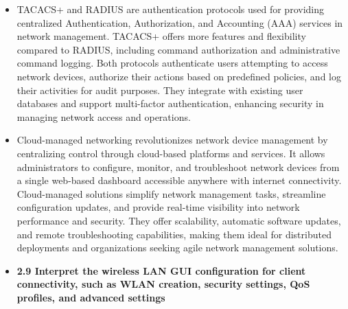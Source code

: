 \documentclass{article}
\begin{document}
\begin{itemize}
	\item[] TACACS+ and RADIUS are authentication protocols used for providing centralized Authentication, Authorization, and Accounting (AAA) services in network management. TACACS+ offers more features and flexibility compared to RADIUS, including command authorization and administrative command logging. Both protocols authenticate users attempting to access network devices, authorize their actions based on predefined policies, and log their activities for audit purposes. They integrate with existing user databases and support multi-factor authentication, enhancing security in managing network access and operations.
	\item[] Cloud-managed networking revolutionizes network device management by centralizing control through cloud-based platforms and services. It allows administrators to configure, monitor, and troubleshoot network devices from a single web-based dashboard accessible anywhere with internet connectivity. Cloud-managed solutions simplify network management tasks, streamline configuration updates, and provide real-time visibility into network performance and security. They offer scalability, automatic software updates, and remote troubleshooting capabilities, making them ideal for distributed deployments and organizations seeking agile network management solutions.
  
  \item \textbf{2.9 Interpret the wireless LAN GUI configuration for client connectivity, such as WLAN creation, security settings, QoS profiles, and advanced settings}\\
\end{itemize}
\end{document}
